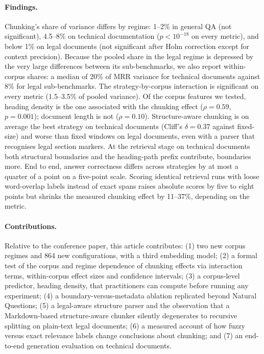 \documentclass[runningheads]{llncs}
\begin{document}
\paragraph{Findings.} Chunking's share of variance differs by regime: 1--2\% in general QA (not significant), 4.5--8\% on technical documentation ($p<10^{-18}$ on every metric), and below 1\% on legal documents (not significant after Holm correction except for context precision). Because the pooled share in the legal regime is depressed by the very large differences between its sub-benchmarks, we also report within-corpus shares: a median of 20\% of MRR variance for technical documents against 8\% for legal sub-benchmarks. The strategy-by-corpus interaction is significant on every metric (1.5--3.5\% of pooled variance). Of the corpus features we tested, heading density is the one associated with the chunking effect ($\rho=0.59$, $p=0.001$); document length is not ($\rho=0.10$). Structure-aware chunking is on average the best strategy on technical documents (Cliff's $\delta=0.37$ against fixed-size) and worse than fixed windows on legal documents, even with a parser that recognises legal section markers. At the retrieval stage on technical documents both structural boundaries and the heading-path prefix contribute, boundaries more. End to end, answer correctness differs across strategies by at most a quarter of a point on a five-point scale. Scoring identical retrieval runs with loose word-overlap labels instead of exact spans raises absolute scores by five to eight points but shrinks the measured chunking effect by 11--37\%, depending on the metric.

\paragraph{Contributions.} Relative to the conference paper, this article contributes: (1) two new corpus regimes and 864 new configurations, with a third embedding model; (2) a formal test of the corpus and regime dependence of chunking effects via interaction terms, within-corpus effect sizes and confidence intervals; (3) a corpus-level predictor, heading density, that practitioners can compute before running any experiment; (4) a boundary-versus-metadata ablation replicated beyond Natural Questions; (5) a legal-aware structure parser and the observation that a Markdown-based structure-aware chunker silently degenerates to recursive splitting on plain-text legal documents; (6) a measured account of how fuzzy versus exact relevance labels change conclusions about chunking; and (7) an end-to-end generation evaluation on technical documents.
\end{document}
